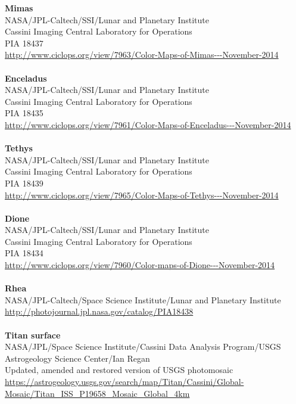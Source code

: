 \documentclass[Orbiter User Manual.tex]{subfiles}
\begin{document}
\textbf{Mimas}\\
NASA/JPL-Caltech/SSI/Lunar and Planetary Institute\\
Cassini Imaging Central Laboratory for Operations\\
PIA 18437\\
\url{http://www.ciclops.org/view/7963/Color-Maps-of-Mimas---November-2014}\\
\\
\textbf{Enceladus}\\
NASA/JPL-Caltech/SSI/Lunar and Planetary Institute\\
Cassini Imaging Central Laboratory for Operations\\
PIA 18435\\
\url{http://www.ciclops.org/view/7961/Color-Maps-of-Enceladus---November-2014}\\
\\
\textbf{Tethys}\\
NASA/JPL-Caltech/SSI/Lunar and Planetary Institute\\
Cassini Imaging Central Laboratory for Operations\\
PIA 18439\\
\url{http://www.ciclops.org/view/7965/Color-Maps-of-Tethys---November-2014}\\
\\
\textbf{Dione}\\
NASA/JPL-Caltech/SSI/Lunar and Planetary Institute\\
Cassini Imaging Central Laboratory for Operations\\
PIA 18434\\
\url{http://www.ciclops.org/view/7960/Color-maps-of-Dione---November-2014}\\
\\
\textbf{Rhea}\\
NASA/JPL-Caltech/Space Science Institute/Lunar and Planetary Institute\\
\url{http://photojournal.jpl.nasa.gov/catalog/PIA18438}\\
\\
\textbf{Titan surface}\\
NASA/JPL/Space Science Institute/Cassini Data Analysis Program/USGS Astrogeology Science Center/Ian Regan\\
Updated, amended and restored version of USGS photomosaic\\
\url{https://astrogeology.usgs.gov/search/map/Titan/Cassini/Global-Mosaic/Titan_ISS_P19658_Mosaic_Global_4km}\\
\end{document}
